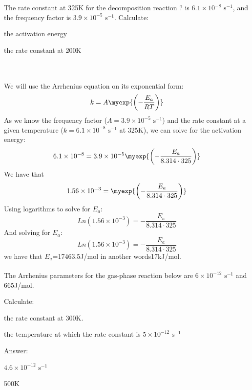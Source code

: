 \documentclass[main.tex]{subfiles}
\begin{document}
\begin{description}
\begin{example} %
The rate constant at 325K for the decomposition reaction ? is $6.1\times10^{-8}\text{ s}^{-1}$, and the frequency factor is $3.9\times10^{-5}\text{ s}^{-1}$.    
Calculate:
\begin{inparaenum}[(a)]	
\item the activation energy
\item	 the rate constant at 200K
\end{inparaenum} \\
\\
We will use the Arrhenius equation on its exponential form:
\[k=A\myexp{\left(-\frac{E_a}{RT}\right)}\]
As we know the frequency factor ($A=3.9\times10^{-5}\text{ s}^{-1}$) and the rate constant at a given temperature ($k=6.1\times10^{-8}\text{ s}^{-1}$ at 325K), we can solve for the activation energy:
\[6.1\times10^{-8} =3.9\times10^{-5}\myexp{	\left(-\frac{E_a}{8.314\cdot 325}	\right)	}\]
We have that 
\[1.56\times10^{-3} = \myexp{\left(-\frac{E_a}{8.314\cdot 325}\right)}\]
Using logarithms to solve for $E_a$:
\[Ln(1.56\times10^{-3}) =  -\frac{E_a}{8.314\cdot 325}\]
And solving for $E_a$:
\[Ln(1.56\times10^{-3}) =  -\frac{E_a}{8.314\cdot 325}\]
we have that $E_a$=17463.5J/mol in another words17kJ/mol.
\\\faDiamond\ \\
The Arrhenius parameters for the gas-phase reaction below are $6\times10^{-12}\text{ s}^{-1}$ and 665J/mol. 
\begin{center}\end{center}
Calculate:
\begin{inparaenum}[(a)]	
\item  the rate constant at 300K.
\item	 the temperature at which the rate constant is $5\times10^{-12}\text{ s}^{-1}$
\end{inparaenum} 
\flushright Answer:   
\begin{inparaenum}[(a)]	
\item  $4.6\times10^{-12}\text{ s}^{-1}$
\item	 500K
\end{inparaenum}
\end{example}%


\end{description}
\end{document}
